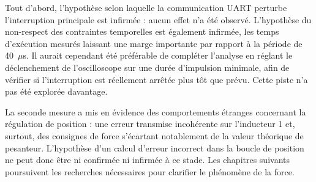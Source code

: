 Tout d'abord, l'hypothèse selon laquelle la communication UART perturbe l'interruption principale est infirmée : aucun effet n'a été observé. L'hypothèse du non-respect des contraintes temporelles est également infirmée, les temps d'exécution mesurés laissant une marge importante par rapport à la période de 40~$\mu$s. Il aurait cependant été préférable de compléter l'analyse en réglant le déclenchement de l'oscilloscope sur une durée d'impulsion minimale, afin de vérifier si l'interruption est réellement arrêtée plus tôt que prévu. Cette piste n'a pas été explorée davantage.

La seconde mesure a mis en évidence des comportements étranges concernant la régulation de position : une erreur transmise incohérente sur l'inducteur 1 et, surtout, des consignes de force s'écartant notablement de la valeur théorique de pesanteur. L'hypothèse d'un calcul d'erreur incorrect dans la boucle de position ne peut donc être ni confirmée ni infirmée à ce stade. Les chapitres suivants poursuivent les recherches nécessaires pour clarifier le phénomène de la force.